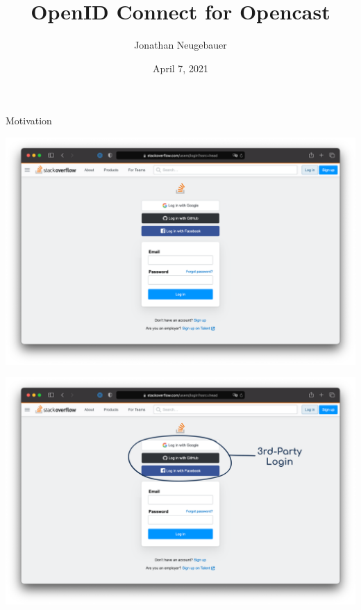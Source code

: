 \documentclass[aspectratio=169]{beamer}
\title{OpenID Connect for Opencast}
\author{Jonathan Neugebauer}
\date{April 7, 2021}
\begin{document}
\maketitle

\begin{frame}{Motivation}
	\begin{overprint}
		\centerline{\includegraphics[height=0.9\textheight]{figures/motivation-1}}
		\centerline{\includegraphics[height=0.9\textheight]{figures/motivation-2}}
	\end{overprint}
\end{frame}
\end{document}

